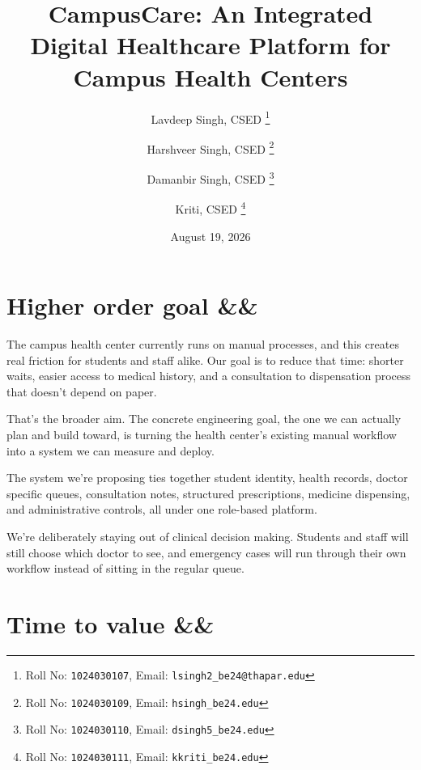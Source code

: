\documentclass[11pt,a4paper]{article}
\title{CampusCare: An Integrated Digital Healthcare Platform for Campus Health Centers}
\author{%
  Lavdeep Singh, CSED%
  \thanks{Roll No: \texttt{1024030107},%
    Email: \texttt{lsingh2\_be24@thapar.edu}}%
  \and
  Harshveer Singh, CSED%
  \thanks{Roll No: \texttt{1024030109},%
    Email: \texttt{hsingh\_be24\@thapar.edu}}%
  \and
  Damanbir Singh, CSED%
  \thanks{Roll No: \texttt{1024030110},%
    Email: \texttt{dsingh5\_be24\@thapar.edu}}%
  \and
  Kriti, CSED%
  \thanks{Roll No: \texttt{1024030111},%
    Email: \texttt{kkriti\_be24\@thapar.edu}}%
}
\date{August 19, 2026}
\newcommand{\BvrHint}[1]{%
  \ifx&#1&%
  \else
    {\normalfont\normalsize\itshape\hfill #1}%
  \fi}
\begin{document}
\maketitle


\section{Higher order goal \BvrHint{}}

The campus health center currently runs on manual processes, and this creates real friction for students and staff alike. Our goal is to reduce that time: shorter waits, easier access to medical history, and a consultation to dispensation process that doesn't depend on paper.

That's the broader aim. The concrete engineering goal, the one we can actually plan and build toward, is turning the health center's existing manual workflow into a system we can measure and deploy.

The system we're proposing ties together student identity, health records, doctor specific queues, consultation notes, structured prescriptions, medicine dispensing, and administrative controls, all under one role-based platform.

We're deliberately staying out of clinical decision making. Students and staff will still choose which doctor to see, and emergency cases will run through their own workflow instead of sitting in the regular queue.


\section{Time to value \BvrHint{}}
\end{document}
